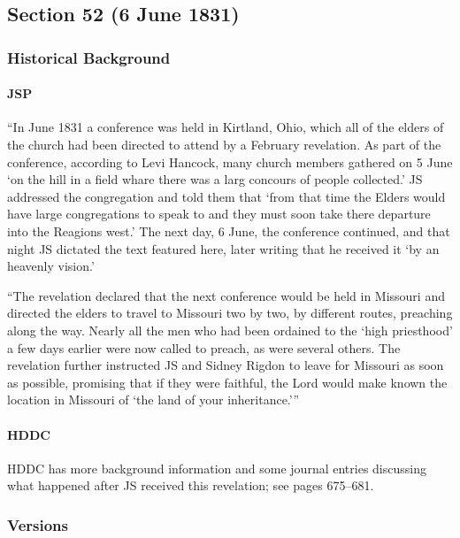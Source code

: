 \subsection{Section 52 (6 June 1831)}
	\label{DC52}
	
	\subsubsection{Historical Background}
		\label{DC52-HB}
		
		\paragraph{JSP}
		
			``In June 1831 a conference was held in Kirtland, Ohio, which all of the elders of the church had been directed to attend by a February revelation. As part of the conference, according to Levi Hancock, many church members gathered on 5 June `on the hill in a field whare there was a larg concours of people collected.' JS addressed the congregation and told them that `from that time the Elders would have large congregations to speak to and they must soon take there departure into the Reagions west.' The next day, 6 June, the conference continued, and that night JS dictated the text featured here, later writing that he received it `by an heavenly vision.'
			
			``The revelation declared that the next conference would be held in Missouri and directed the elders to travel to Missouri two by two, by different routes, preaching along the way. Nearly all the men who had been ordained to the `high priesthood' a few days earlier were now called to preach, as were several others. The revelation further instructed JS and Sidney Rigdon to leave for Missouri as soon as possible, promising that if they were faithful, the Lord would make known the location in Missouri of `the land of your inheritance.'''
			
		\paragraph{HDDC}
		
			HDDC has more background information and some journal entries discussing what happened after JS received this revelation; see pages 675--681.
		
	\subsubsection{Versions}
		\label{DC52-V}
		
